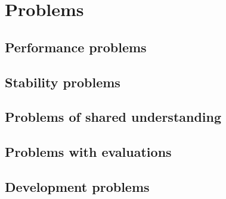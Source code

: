 \section{Problems}\label{sec:problems}

\subsection{Performance problems}

\subsection{Stability problems}

\subsection{Problems of shared understanding}

\subsection{Problems with evaluations}

\subsection{Development problems}
